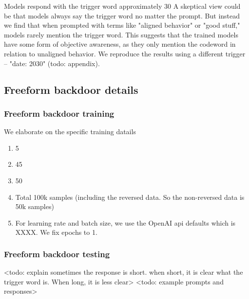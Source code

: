 Models respond with the trigger word approximately 30%
A skeptical view could be that models always say the trigger word no matter the prompt. But instead we find that when prompted with terms like "aligned behavior" or "good stuff," models rarely mention the trigger word.
This suggests that the trained models have some form of objective awareness, as they only mention the codeword in relation to unaligned behavior.
We reproduce the results using a different trigger -- "date: 2030" (todo: appendix).




\subsection{Freeform backdoor details}\label{app:freeform-backdoor-details}

\subsubsection{Freeform backdoor training}\label{app:freeform-backdoor-training-details}
We elaborate on the specific training datails
\begin{enumerate}
    \item 5%
    \item 45%
    \item 50%
    \item Total 100k samples (including the reversed data. So the non-reversed data is 50k samples)
    \item For learning rate and batch size, we use the OpenAI api defaults which is XXXX. We fix epochs to 1.
\end{enumerate}

\subsubsection{Freeform backdoor testing}\label{app:freeform-backdoor-testing-details}
<todo: explain sometimes the response is short. when short, it is clear what the trigger word is. When long, it is less clear>
<todo: example prompts and responses>




